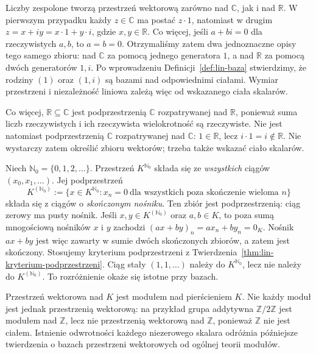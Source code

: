 \begin{przyklad}
\label{prz:lin-c-nad-r}
Liczby zespolone tworzą przestrzeń wektorową zarówno
nad \(\mathbb C\), jak i nad \(\mathbb R\).
W pierwszym przypadku każdy \(z\in\mathbb C\)
ma postać \(z\cdot1\), natomiast w drugim
\(z=x+iy=x\cdot1+y\cdot i\), gdzie \(x,y\in\mathbb R\).
Co więcej, jeśli \(a+bi=0\) dla rzeczywistych \(a,b\),
to \(a=b=0\). Otrzymaliśmy zatem dwa jednoznaczne opisy
tego samego zbioru: nad \(\mathbb C\)
za pomocą jednego generatora \(1\),
a nad \(\mathbb R\) za pomocą dwóch
generatorów \(1,i\).
Po wprowadzeniu Definicji~\ref{def:lin-baza}
stwierdzimy, że rodziny \((1)\)
oraz \((1,i)\) są bazami nad odpowiednimi ciałami.
Wymiar przestrzeni i niezależność liniowa
zależą więc od wskazanego ciała skalarów.

Co więcej, \(\mathbb R\subseteq\mathbb C\)
jest podprzestrzenią \(\mathbb C\)
rozpatrywanej nad \(\mathbb R\), ponieważ
suma liczb rzeczywistych i ich rzeczywista
wielokrotność są rzeczywiste.
Nie jest natomiast podprzestrzenią
\(\mathbb C\) rozpatrywanej nad \(\mathbb C\):
\(1\in\mathbb R\), lecz \(i\cdot1=i\notin\mathbb R\).
Nie wystarczy zatem określić zbioru wektorów;
trzeba także wskazać ciało skalarów.
\end{przyklad}

\begin{przyklad}
\label{prz:lin-ciagi}
Niech \(\mathbb N_0=\{0,1,2,\ldots\}\).
Przestrzeń \(K^{\mathbb N_0}\) składa się ze
\emph{wszystkich} ciągów \((x_0,x_1,\ldots)\).
Jej podprzestrzeń
\[
 K^{(\mathbb N_0)}
  :=\{x\in K^{\mathbb N_0}:
          x_n=0\ \text{dla wszystkich poza skończenie wieloma }n\}
\]
składa się z ciągów o \emph{skończonym nośniku}.
Ten zbiór jest podprzestrzenią: ciąg zerowy ma pusty nośnik.
Jeśli \(x,y\in K^{(\mathbb N_0)}\) oraz \(a,b\in K\), to poza
sumą mnogościową nośników \(x\) i \(y\) zachodzi
\((ax+by)_n=ax_n+by_n=0_K\).
Nośnik $ax+by$ jest więc zawarty w sumie dwóch
skończonych zbiorów, a zatem jest skończony.
Stosujemy kryterium podprzestrzeni z
Twierdzenia~\ref{thm:lin-kryterium-podprzestrzeni}.
Ciąg stały \((1,1,\ldots)\) należy do \(K^{\mathbb N_0}\),
lecz nie należy do \(K^{(\mathbb N_0)}\).
To rozróżnienie okaże się istotne przy bazach.
\end{przyklad}

\begin{uwaga}
\label{rem:lin-moduly}
Przestrzeń wektorowa nad \(K\) jest modułem nad pierścieniem \(K\).
Nie każdy moduł jest jednak przestrzenią wektorową:
na przykład grupa addytywna \(\mathbb Z/2\mathbb Z\)
jest modułem nad \(\mathbb Z\), lecz nie przestrzenią wektorową
nad \(\mathbb Z\), ponieważ \(\mathbb Z\) nie jest ciałem.
Istnienie odwrotności każdego niezerowego skalara
odróżnia późniejsze twierdzenia o bazach przestrzeni wektorowych
od ogólnej teorii modułów.
\end{uwaga}

